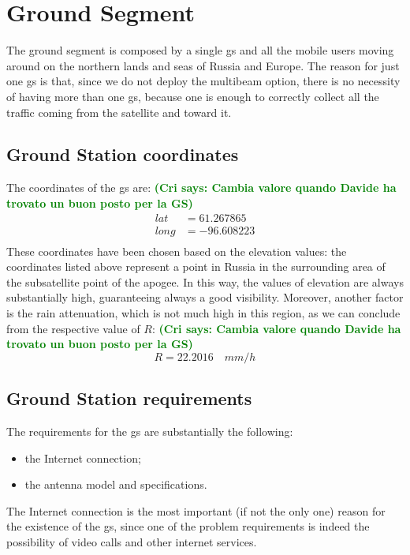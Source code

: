 \documentclass[11pt,a4paper,titlepage]{article}
\newcommand{\cri}[1]{\textcolor{green}{\textbf{(Cri says: #1)}}}
\begin{document}
\section{Ground Segment}
	The ground segment is composed by a single \gls{gs} and all the mobile users moving around on the northern lands and 		seas of Russia and Europe. The reason for just one \gls{gs} is that, since we do not deploy the multibeam option, there is no 		necessity of having more than one \gls{gs}, because one is enough to correctly collect all the traffic coming from the satellite 		and toward it.
	\subsection{Ground Station coordinates}
		The coordinates of the \gls{gs} are: \cri{Cambia valore quando Davide ha trovato un buon posto per la GS}
		\begin{align}
		lat &= 61.267865\\ 
		long &= -96.608223\\
		\end{align}
		These coordinates have been chosen based on the elevation values: the coordinates listed above represent a point in 				Russia in the surrounding area of the subsatellite point of the apogee. In this way, the values of elevation are always 				substantially high, guaranteeing always a good visibility. Moreover, another factor is the rain attenuation, which is not 			much high in this region, as we can conclude from the respective value of $R$:  \cri{Cambia valore quando Davide ha trovato un buon posto per la GS}
		\begin{equation}
		R = 22.2016 \quad mm/h
		\end{equation}
	\subsection{Ground Station requirements}
		The requirements for the \gls{gs} are substantially the following:
		\begin{itemize}
			\item the Internet connection;
			\item the antenna model and specifications.
		\end{itemize}

		The Internet connection is the most important (if not the only one) reason for the existence of the \gls{gs}, since one of 			the problem requirements is indeed the possibility of video calls and other internet services.
\end{document}
